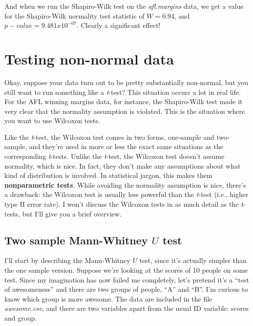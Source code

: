 \documentclass[
  a4paper,
]{book}
\begin{document}
And when we run the Shapiro-Wilk test on the \emph{afl.margins} data, we
get a value for the Shapiro-Wilk normality test statistic of
\(W = 0.94\), and \(p-value = 9.481x10^{-07}\). Clearly a significant
effect!

\hypertarget{testing-non-normal-data}{%
\section{Testing non-normal data}\label{testing-non-normal-data}}

Okay, suppose your data turn out to be pretty substantially non-normal,
but you still want to run something like a \emph{t}-test? This situation
occurs a lot in real life. For the AFL winning margins data, for
instance, the Shapiro-Wilk test made it very clear that the normality
assumption is violated. This is the situation where you want to use
Wilcoxon tests.

Like the \emph{t}-test, the Wilcoxon test comes in two forms, one-sample
and two-sample, and they're used in more or less the exact same
situations as the corresponding \emph{t}-tests. Unlike the
\emph{t}-test, the Wilcoxon test doesn't assume normality, which is
nice. In fact, they don't make any assumptions about what kind of
distribution is involved. In statistical jargon, this makes them
\textbf{nonparametric tests}. While avoiding the normality assumption is
nice, there's a drawback: the Wilcoxon test is usually less powerful
than the \emph{t}-test (i.e., higher type II error rate). I won't
discuss the Wilcoxon tests in as much detail as the \emph{t}-tests, but
I'll give you a brief overview.

\hypertarget{two-sample-mann-whitney-u-test}{%
\subsection{\texorpdfstring{Two sample Mann-Whitney \(U\)
test}{Two sample Mann-Whitney U test}}\label{two-sample-mann-whitney-u-test}}

I'll start by describing the Mann-Whitney \(U\) test, since it's
actually simpler than the one sample version. Suppose we're looking at
the scores of 10 people on some test. Since my imagination has now
failed me completely, let's pretend it's a ``test of awesomeness'' and
there are two groups of people, ``A'' and ``B''. I'm curious to know
which group is more awesome. The data are included in the file
\emph{awesome.csv}, and there are two variables apart from the usual ID
variable: scores and group.
\end{document}
